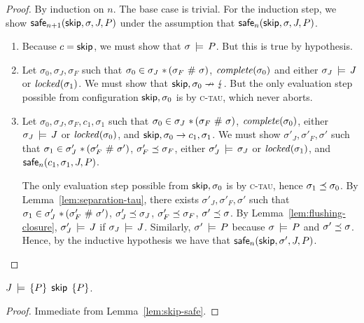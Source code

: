 \documentclass[11pt]{report}
\begin{document}
\begin{proof}
	By induction on $n$. The base case is trivial. For the induction step, we show $\mathsf{safe}_{n+1}(\operatorname{\mathsf{skip}},\sigma,J,P)$ under the assumption that $\mathsf{safe}_{n}(\operatorname{\mathsf{skip}},\sigma,J,P)$. 
	\begin{enumerate}
		\item Because $c = \operatorname{\mathsf{skip}}$, we must show that $\sigma \,\models\, P$. But this is true by hypothesis. 

		\item Let $\sigma_0,\sigma_J,\sigma_F$ such that $\sigma_0 \in \sigma_J \operatorname{\,\ast\,} (\sigma_F \operatorname{\,\#\,} \sigma)$, $\mathit{complete}(\sigma_0)$ and either $\sigma_J \,\models\, J$ or $\mathit{locked}(\sigma_1)$. We must show that $\operatorname{\mathsf{skip}},\sigma_0 \nrightarrow \lightning$. But the only evaluation step possible from configuration $\operatorname{\mathsf{skip}},\sigma_0$ is by \textsc{c-tau}, which never aborts. 

		\item Let $\sigma_0,\sigma_J,\sigma_F,c_1,\sigma_1$ such that $\sigma_0 \in \sigma_J \operatorname{\,\ast\,} (\sigma_F \operatorname{\,\#\,} \sigma)$, $\mathit{complete}(\sigma_0)$, either $\sigma_J \,\models\, J$ or $\mathit{locked}(\sigma_0)$, and $\operatorname{\mathsf{skip}},\sigma_0 \rightarrow c_1,\sigma_1$. We must show $\sigma'_J,\sigma'_F,\sigma'$ such that $\sigma_1 \in \sigma'_J \operatorname{\,\ast\,} (\sigma'_F \operatorname{\,\#\,} \sigma')$, $\sigma'_F \preceq \sigma_F$, either $\sigma'_J \,\models\, \sigma_J$ or $\mathit{locked}(\sigma_1)$, and $\mathsf{safe}_{n}(c_1,\sigma_1,J,P)$.

		The only evaluation step possible from $\operatorname{\mathsf{skip}},\sigma_0$ is by \textsc{c-tau}, hence $\sigma_1 \preceq \sigma_0$. By Lemma~\ref{lem:separation-tau}, there exists $\sigma'_J,\sigma'_F,\sigma'$ such that $\sigma_1 \in \sigma'_J \operatorname{\,\ast\,} (\sigma'_F \operatorname{\,\#\,} \sigma')$, $\sigma'_J \preceq \sigma_J$, $\sigma'_F \preceq \sigma_F$, $\sigma' \preceq \sigma$. By Lemma~\ref{lem:flushing-closure}, $\sigma'_J \,\models\, J$ if $\sigma_J \,\models\, J$. Similarly, $\sigma' \,\models\, P$ because $\sigma \,\models\, P$ and $\sigma' \preceq \sigma$. Hence, by the inductive hypothesis we have that $\mathsf{safe}_{n}(\operatorname{\mathsf{skip}},\sigma',J,P)$. 
	\end{enumerate}
\end{proof}

\begin{lemma}
	\label{lem:skip-sound}
	$J\,\models\,\left\lbrace P \right\rbrace\;\operatorname{\mathsf{skip}}\;\left\lbrace P \right\rbrace$. 
\end{lemma}

\begin{proof}
	Immediate from Lemma~\ref{lem:skip-safe}. 
\end{proof}
\end{document}
